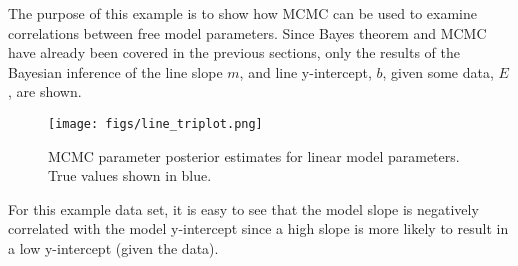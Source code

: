 \documentclass[10pt,a4paper]{report}
\begin{document}
The purpose of this example is to show how MCMC can be used to examine correlations between free model parameters.  Since Bayes theorem and MCMC have already been covered in the previous sections, only the results of the Bayesian inference of the line slope $m$, and line y-intercept, $b$, given some data, $E$, are shown.

\begin{figure}[h]
\centering
    \texttt{[image: figs/line\_triplot.png]}
    \caption{MCMC parameter posterior estimates for linear model parameters.  \\
    True values shown in blue.  \label{fig:line_triplot}}
\end{figure}

For this example data set, it is easy to see that the model slope is negatively correlated with the model y-intercept since a high slope is more likely to result in a low y-intercept (given the data).
\end{document}
